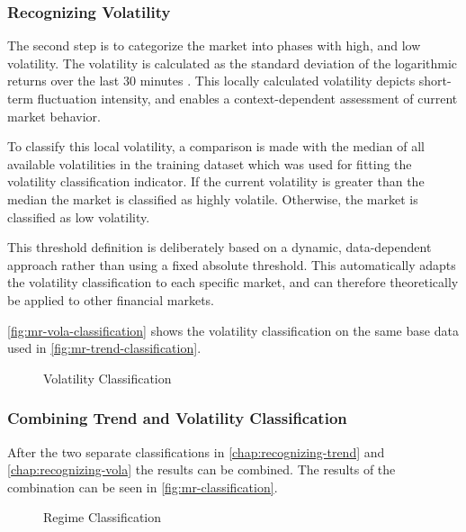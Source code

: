 \subsubsection{Recognizing Volatility}
\label{chap:recognizing-vola}

The second step is to categorize the market into phases with high, and low volatility.
The volatility is calculated as the standard deviation of the logarithmic returns over the last 30 minutes \cite{wiki-vola}.
This locally calculated volatility depicts short-term fluctuation intensity, and enables a context-dependent assessment of current market behavior.

To classify this local volatility, a comparison is made with the median of all available volatilities in the training dataset which was used for fitting the volatility classification indicator.
If the current volatility is greater than the median the market is classified as highly volatile.
Otherwise, the market is classified as low volatility.

This threshold definition is deliberately based on a dynamic, data-dependent approach rather than using a fixed absolute threshold.
This automatically adapts the volatility classification to each specific market, and can therefore theoretically be applied to other financial markets.

\autoref{fig:mr-vola-classification} shows the volatility classification on the same base data used in \autoref{fig:mr-trend-classification}.

\begin{figure}[H]
    \centering
    
    \caption{Volatility Classification}
    \label{fig:mr-vola-classification}
\end{figure}

\subsubsection{Combining Trend and Volatility Classification}

After the two separate classifications in \autoref{chap:recognizing-trend} and \autoref{chap:recognizing-vola} the results can be combined.
The results of the combination can be seen in \autoref{fig:mr-classification}.

\begin{figure}[H]
    \centering
    
    \caption{Regime Classification}
    \label{fig:mr-classification}
\end{figure}

